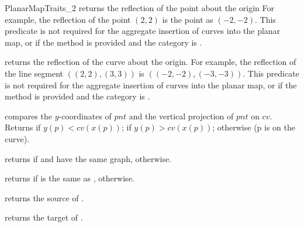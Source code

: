 \begin{ccRefConcept}{PlanarMapTraits_2}
         {returns the reflection of the point  about the origin
	   For example, the reflection of the point $(2,2)$ is the point as
	   $(-2,-2)$. This predicate is not required for the aggregate
	   insertion of curves into the planar map, or if the method
	    is provided and
	   the  category is .}
	   
         {returns the reflection of the curve  about the origin.
          For example, the reflection of the line segment $((2,2),(3,3))$
	  is $((-2,-2),(-3,-3))$. This predicate is not required for the
	  aggregate insertion of curves into the planar map, or if the method
	   is provided and the
	   category is .}

         {compares the $y$-coordinates of $pnt$ and the vertical projection of
	   $pnt$ on $cv$. Returns  if $y(p) < cv(x(p))$;
	    if $y(p) > cv(x(p))$;
	    otherwise (p is on the curve).
           }

         {returns  if  and  have the same graph, 
            otherwise.}

         {returns  if  is the same as , 
           otherwise.}
	  

         {returns the source of .}

             {returns the target of .}


      

\end{ccRefConcept}
